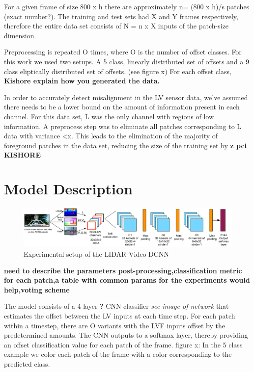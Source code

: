 \documentclass{article}
\begin{document}
For a given frame of size 800 x h there are approximately n= (800 x h)/s patches (exact number?). The training and test sets had X and Y frames respectively, therefore the entire data set consists of  N = n x X inputs of the patch-size dimension. 

Preprocessing is repeated O times, where O is the number of offset classes. For this work we used two setups. A 5 class, linearly distributed set of offsets and a 9 class eliptically distributed set of offsets. (see figure x) For each offset class, \textbf{Kishore explain how you generated the data.} 

In order to accurately detect misalignment in the LV sensor data, we've assumed there needs to be a lower bound on the amount of information present in each channel. For this data set, L was the only channel with regions of low information. A preprocess step was to eliminate all patches corresponding to L data with variance <x. This leads to the elimination of the majority of foreground patches in the data set, reducing the size of the training set by \textbf{z pct KISHORE}



\section{Model Description} %
\label{sec:model_description}

\begin{figure}[htbp]
    \centering
        \includegraphics[scale=0.35]{Figures/lidar_dcnn_setup1.pdf}
    \caption{Experimental setup of the LIDAR-Video DCNN}
    \label{fig:Figures_lidar_dcnn_setup1}
\end{figure}

\textbf{need to describe the parameters post-processing,classification metric for each patch,a table with common params for the experiments would help,voting scheme}

The model consists of a 4-layer \textbf{?} CNN classifier \textit{see image of network} that estimates the offset between the LV inputs at each time step. For each patch within a timestep, there are O variants with the LVF inputs offset by the predetermined amounts. The CNN outputs to a softmax layer, thereby providing an offset classification value for each patch of the frame. 
figure x: In the 5 class example we color each patch of the frame with a color corresponding to the predicted class. 
\end{document}
